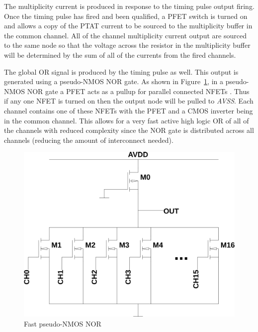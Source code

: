 \documentclass[12pt,oneside,final]{siuethesis}
\theoremstyle{definition}
\begin{document}
\par The multiplicity current is produced in response to the timing pulse output firing. Once the timing pulse has fired and been qualified, a PFET switch is turned on and allows a copy of the PTAT current to be sourced to the multiplicity buffer in the common channel. All of the channel multiplicity current output are sourced to the same node so that the voltage across the resistor in the multiplicity buffer will be determined by the sum of all of the currents from the fired channels. 
\par The global OR signal is produced by the timing pulse as well. This output is generated using a pseudo-NMOS NOR gate. As shown in Figure~\ref{fig:pseudo-nmos}, in a pseudo-NMOS NOR gate a PFET acts as a pullup for parallel connected NFETs \cite{WESTE}. Thus if any one NFET is turned on then the output node will be pulled to \emph{AVSS}. Each channel contains one of these NFETs with the PFET and a CMOS inverter being in the common channel. This allows for a very fast active high logic OR of all of the channels with reduced complexity since the NOR gate is distributed across all channels (reducing the amount of interconnect needed).

\begin{figure}[htbp!]
 \centering
 \includegraphics[scale=.35,keepaspectratio=true]{../LTspice_Drawings/pseudo-nmos/pseudo-nmos.png}
 \caption{Fast pseudo-NMOS NOR}
 \label{fig:pseudo-nmos}
\end{figure}

\end{document}
